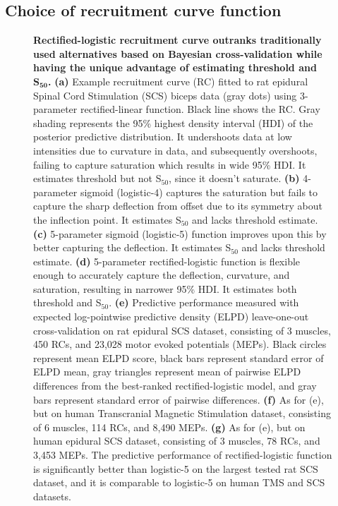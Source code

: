 \documentclass[sn-mathphys-ay]{sn-jnl}%
\theoremstyle{thmstyleone}%
\theoremstyle{thmstyletwo}%
\theoremstyle{thmstylethree}%
\begin{document}
\subsection{Choice of recruitment curve function}\label{res-choice}
\begin{figure}[h]
    \centering
    \caption{\textbf{Rectified-logistic recruitment curve outranks traditionally used alternatives based on Bayesian cross-validation while having the unique advantage of estimating threshold and $\textbf{S}_\mathbf{50}$.} \textbf{(a)} Example recruitment curve (RC) fitted to rat epidural Spinal Cord Stimulation (SCS) biceps data (gray dots) using 3-parameter rectified-linear function. Black line shows the RC. Gray shading represents the 95\% highest density interval (HDI) of the posterior predictive distribution. It undershoots data at low intensities due to curvature in data, and subsequently overshoots, failing to capture saturation which results in wide 95\% HDI. It estimates threshold but not S$_{50}$, since it doesn’t saturate. \textbf{(b)} 4-parameter sigmoid (logistic-4) captures the saturation but fails to capture the sharp deflection from offset due to its symmetry about the inflection point. It estimates S$_{50}$ and lacks threshold estimate. \textbf{(c)} 5-parameter sigmoid (logistic-5) function improves upon this by better capturing the deflection. It estimates S$_{50}$ and lacks threshold estimate. \textbf{(d)} 5-parameter rectified-logistic function is flexible enough to accurately capture the deflection, curvature, and saturation, resulting in narrower 95\% HDI. It estimates both threshold and S$_{50}$. \textbf{(e)} Predictive performance measured with expected log-pointwise predictive density (ELPD) leave-one-out cross-validation on rat epidural SCS dataset, consisting of 3 muscles, 450 RCs, and 23,028 motor evoked potentials (MEPs). Black circles represent mean ELPD score, black bars represent standard error of ELPD mean, gray triangles represent mean of pairwise ELPD differences from the best-ranked rectified-logistic model, and gray bars represent standard error of pairwise differences. \textbf{(f)} As for (e), but on human Transcranial Magnetic Stimulation dataset, consisting of 6 muscles, 114 RCs, and 8,490 MEPs. \textbf{(g)} As for (e), but on human epidural SCS dataset, consisting of 3 muscles, 78 RCs, and 3,453 MEPs. The predictive performance of rectified-logistic function is significantly better than logistic-5 on the largest tested rat SCS dataset, and it is comparable to logistic-5 on human TMS and SCS datasets.}\label{fig-choice}
\end{figure}
\end{document}
